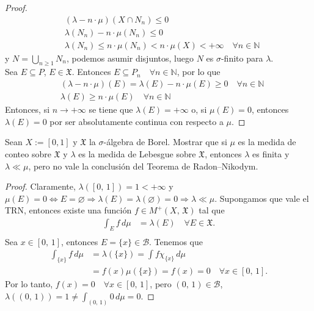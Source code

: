 \documentclass[12pt]{article}
\newenvironment{statement}[2][Ejercicio]{\begin{trivlist}
\item[\hskip \labelsep {\bfseries #1}\hskip \labelsep {\bfseries #2.}]}{\end{trivlist}}
\begin{document}
\begin{proof}
    \begin{align*}
         & (\lambda - n \cdot \mu)(X \cap N_n) \leq 0                                                   \\
         & \lambda(N_n) - n \cdot \mu(N_n) \leq 0                                                       \\
         & \lambda(N_n) \leq n \cdot \mu(N_n) < n \cdot \mu(X) < +\infty \quad \forall n \in \mathbb{N}
    \end{align*} y \(N = \bigcup_{n \geq 1} N_n \), podemos asumir disjuntos, luego \(N \) es \(\sigma \)-finito para \(\lambda \). \\
    Sea \(E \subseteq P \), \(E \in \mathfrak{X} \). Entonces \(E \subseteq P_n \quad \forall n \in \mathbb{N} \), por lo que \begin{align*}
         & (\lambda - n \cdot \mu)(E) = \lambda(E) - n \cdot \mu(E) \geq 0 \quad \forall n \in \mathbb{N} \\
         & \lambda(E) \geq n \cdot \mu(E) \quad \forall n \in \mathbb{N}
    \end{align*} Entonces, si \(n \to +\infty \) se tiene que \(\lambda(E) = +\infty \) o, si \(\mu(E) = 0 \), entonces \(\lambda(E) = 0 \) por ser absolutamente continua con respecto a \(\mu \).
\end{proof}

\begin{statement}{6}
    Sean \(X := [0,1] \) y \(\mathfrak{X} \) la \(\sigma \)-álgebra de Borel. Mostrar que si \(\mu \) es la medida de conteo sobre \(\mathfrak{X} \) y \(\lambda \) es la medida de Lebesgue sobre \(\mathfrak{X} \), entonces \(\lambda \) es finita y \(\lambda \ll \mu \), pero no vale la conclusión del Teorema de Radon–Nikodym.
\end{statement}

\begin{proof}
    Claramente, \(\lambda([0\text{, }1]) = 1 < +\infty \) y \(\mu(E) = 0 \iff E = \varnothing \Rightarrow \lambda(E) = \lambda(\varnothing) = 0 \Rightarrow \lambda \ll \mu \). Supongamos que vale el TRN, entonces existe una función \(f \in M^+(X\text{, } \mathfrak{X}) \) tal que \begin{align*}
        \int_E f \, d\mu & = \lambda(E) \quad \forall E \in \mathfrak{X}. \\
    \end{align*} Sea \(x \in [0\text{, }1] \), entonces \(E = \{x\} \in \mathcal{B} \). Tenemos que \begin{align*}
        \int_{\{x\}} f \, d\mu & = \lambda(\{x\}) = \int f \chi_{\{x\}} \, d\mu                  \\
                               & = f(x) \mu(\{x\}) = f(x) = 0 \quad \forall x \in [0\text{, }1].
    \end{align*} Por lo tanto, \(f(x) = 0 \quad \forall x \in [0\text{, }1] \), pero \((0\text{, }1) \in \mathcal{B} \), \(\lambda((0\text{, }1)) = 1 \neq \int_{(0\text{, }1)} 0 \, d\mu = 0 \).
\end{proof}
\end{document}
